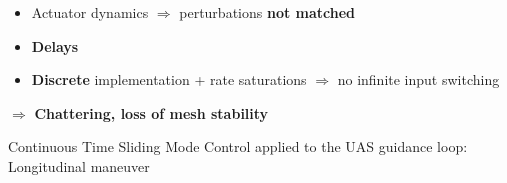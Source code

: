 \documentclass[12pt,svgnames,table,draft=false]{beamer}
\begin{document}
\begin{frame}\frametitle{}
\centering
\begin{tcolorbox}[colback=blue!5!white,colframe=blue!75!black,title=Clash with reality, width=20em,
standard jigsaw,
opacityback=.7]
\begin{itemize}
\item Actuator dynamics $\Rightarrow$ perturbations \textbf{not matched} 
\item \textbf{Delays}
\item \textbf{Discrete} implementation + rate saturations $\Rightarrow$ no infinite input switching
\end{itemize}
\centering
$\Rightarrow$ \textbf{ Chattering, loss of mesh stability} 
\end{tcolorbox}
\end{frame}

\usebackgroundtemplate{}
\begin{frame}
\Large
\vspace{3em}
\begin{center}
Continuous Time Sliding Mode Control applied to the UAS guidance loop:\\
Longitudinal maneuver
\end{center}
\end{frame}
\end{document}

